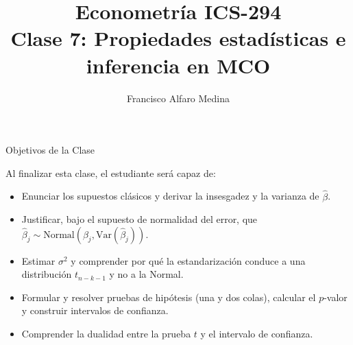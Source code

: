 \documentclass{beamer}
\title[ICS-294]{Econometría ICS-294\\ \small{Clase 7: Propiedades estadísticas e inferencia en MCO}}
\author{Francisco Alfaro Medina}
\institute[USM]
{Universidad Técnica Federico Santa María\\ %
	\medskip
	\textit{francisco.alfaro@usm.cl} %

}
\date{}
\begin{document}
	
\begin{frame}
	\titlepage %


\end{frame}
\logo{}

\begin{frame}{Objetivos de la Clase}

Al finalizar esta clase, el estudiante será capaz de:

\begin{itemize}
    \item[\checkmark] Enunciar los supuestos clásicos y derivar la insesgadez y la varianza de $\hat{\beta}$.
    \item[\checkmark] Justificar, bajo el supuesto de normalidad del error, que $\hat{\beta}_j \sim \text{Normal}(\beta_j, \text{Var}(\hat{\beta}_j))$.
    \item[\checkmark] Estimar $\sigma^2$ y comprender por qué la estandarización conduce a una distribución $t_{n-k-1}$ y no a la Normal.
    \item[\checkmark] Formular y resolver pruebas de hipótesis (una y dos colas), calcular el $p$-valor y construir intervalos de confianza.
    \item[\checkmark] Comprender la dualidad entre la prueba $t$ y el intervalo de confianza.
\end{itemize}

\end{frame}
\end{document}
